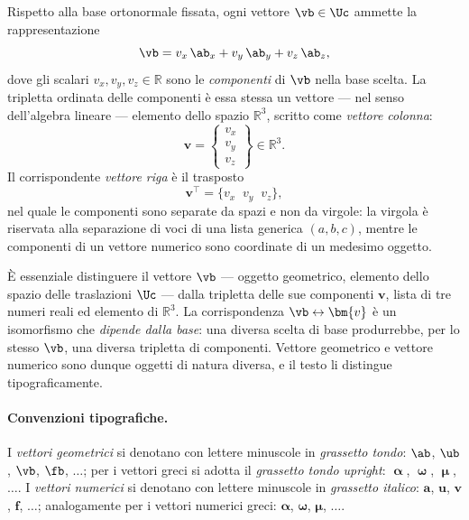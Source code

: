 Rispetto alla base ortonormale fissata, ogni vettore $\vb \in \Uc$ 
ammette la rappresentazione
\begin{equation}
	\vb = v_x\,\ab_x + v_y\,\ab_y + v_z\,\ab_z,
\end{equation}
dove gli scalari $v_x, v_y, v_z \in \mathbb{R}$ sono le 
\textit{componenti} di $\vb$ nella base scelta. La tripletta ordinata delle componenti 
è essa stessa un vettore --- nel senso dell'algebra lineare --- 
elemento dello spazio $\mathbb{R}^3$, scritto come \textit{vettore 
	colonna}:
\begin{equation}
	\bm{v} = \begin{Bmatrix} v_x \\ v_y \\ v_z \end{Bmatrix} 
	\in \mathbb{R}^3.
\end{equation}
Il corrispondente \textit{vettore riga} è il trasposto
\begin{equation}
	\bm{v}^\top = \{ v_x \;\; v_y \;\; v_z \},
\end{equation}
nel quale le componenti sono separate da spazi e non da virgole: 
la virgola è riservata alla separazione di voci di una lista 
generica $(a, b, c)$, mentre le componenti di un vettore numerico 
sono coordinate di un medesimo oggetto.

È essenziale distinguere il vettore $\vb$ --- oggetto geometrico, 
elemento dello spazio delle traslazioni $\Uc$ --- dalla tripletta 
delle sue componenti $\bm{v}$, lista di tre numeri reali ed 
elemento di $\mathbb{R}^3$. La corrispondenza $\vb \leftrightarrow 
\bm{v}$ è un isomorfismo che \textit{dipende dalla base}: una diversa 
scelta di base produrrebbe, per lo stesso $\vb$, una diversa 
tripletta di componenti. Vettore geometrico e vettore numerico 
sono dunque oggetti di natura diversa, e il testo li distingue 
tipograficamente.

\paragraph{Convenzioni tipografiche.}
I \textit{vettori geometrici} si denotano con lettere minuscole 
in \textit{grassetto tondo}: $\ab$, $\ub$, $\vb$, $\fb$, 
$\ldots$; per i vettori greci si adotta il \textit{grassetto 
	tondo upright}: $\bm{\upalpha}$, $\bm{\upomega}$, $\bm{\upmu}$, 
$\ldots$. I \textit{vettori numerici} si denotano con lettere 
minuscole in \textit{grassetto italico}: $\bm{a}$, $\bm{u}$, 
$\bm{v}$, $\bm{f}$, $\ldots$; analogamente per i vettori 
numerici greci: $\bm{\alpha}$, $\bm{\omega}$, $\bm{\mu}$, 
$\ldots$. 

